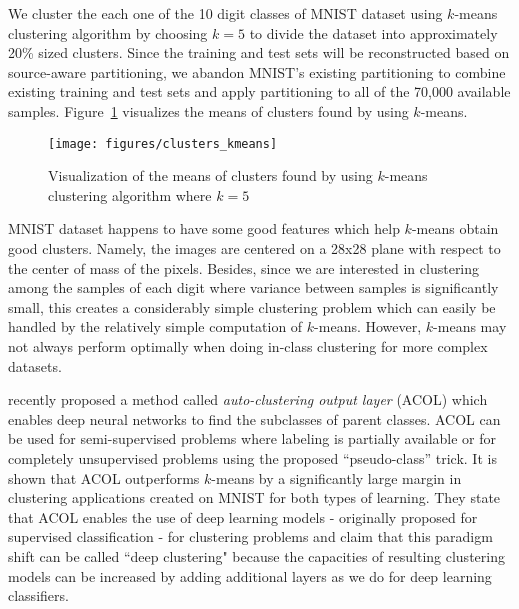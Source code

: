 \documentclass[letterpaper]{article}
\begin{document}
We cluster the each one of the 10 digit classes of MNIST dataset using $k$-means clustering algorithm \cite{kmeans} by choosing $k=5$ to divide the dataset into approximately 20\% sized clusters. Since the training and test sets will be reconstructed based on source-aware partitioning, we abandon MNIST's existing partitioning to combine existing training and test sets and apply partitioning to all of the 70,000 available samples. Figure~\ref{fig:clusters_kmeans} visualizes the means of clusters found by using $k$-means.  

\begin{figure}[t]
	\begin{center}
		\centerline{\texttt{[image: figures/clusters\_kmeans]}}
		\caption{Visualization of the means of clusters found by using $k$-means clustering algorithm where $k=5$ }
		\label{fig:clusters_kmeans}
	\end{center}
\end{figure}
 
MNIST dataset happens to have some good features which help $k$-means obtain good clusters. Namely, the images are centered on a 28x28 plane with respect to the center of mass of the pixels. Besides, since we are interested in clustering among the samples of each digit where variance between samples is significantly small, this creates a considerably simple clustering problem which can easily be handled by the relatively simple computation of $k$-means. However, $k$-means may not always perform optimally when doing in-class clustering for more complex datasets. 

\cite{KilincU17deepclustering} recently proposed a method called \textit{auto-clustering output layer} (ACOL) which enables deep neural networks to find the subclasses of parent classes. ACOL can be used for semi-supervised problems where labeling is partially available or for completely unsupervised problems using the proposed ``pseudo-class'' trick. It is shown that ACOL outperforms $k$-means by a significantly large margin in clustering applications created on MNIST for both types of learning. They state that ACOL enables the use of deep learning models - originally proposed for supervised classification - for clustering problems and claim that this paradigm shift can be called ``deep clustering" because the capacities of resulting clustering models can be increased by adding additional layers as we do for deep learning classifiers. 
\end{document}
